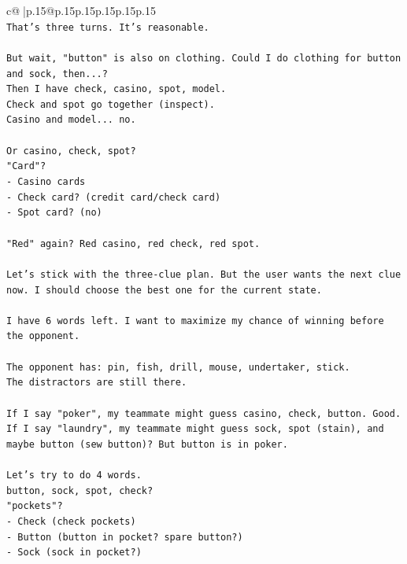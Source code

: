 \documentclass{article}
\begin{document}
{\begin{supertabular}{c@{$\;$}|p{.15\linewidth}@{}p{.15\linewidth}p{.15\linewidth}p{.15\linewidth}p{.15\linewidth}p{.15\linewidth}}
{{{\\ 
\texttt{That's three turns. It's reasonable.} \\
\\ 
\texttt{But wait, "button" is also on clothing. Could I do clothing for button and sock, then...?} \\
\texttt{Then I have check, casino, spot, model.} \\
\texttt{Check and spot go together (inspect).} \\
\texttt{Casino and model... no.} \\
\\ 
\texttt{Or casino, check, spot?} \\
\texttt{"Card"?} \\
\texttt{{-} Casino cards} \\
\texttt{{-} Check card? (credit card/check card)} \\
\texttt{{-} Spot card? (no)} \\
\\ 
\texttt{"Red" again? Red casino, red check, red spot.} \\
\\ 
\texttt{Let's stick with the three{-}clue plan. But the user wants the next clue now. I should choose the best one for the current state.} \\
\\ 
\texttt{I have 6 words left. I want to maximize my chance of winning before the opponent.} \\
\\ 
\texttt{The opponent has: pin, fish, drill, mouse, undertaker, stick.} \\
\texttt{The distractors are still there.} \\
\\ 
\texttt{If I say "poker", my teammate might guess casino, check, button. Good.} \\
\texttt{If I say "laundry", my teammate might guess sock, spot (stain), and maybe button (sew button)? But button is in poker.} \\
\\ 
\texttt{Let's try to do 4 words.} \\
\texttt{button, sock, spot, check?} \\
\texttt{"pockets"?} \\
\texttt{{-} Check (check pockets)} \\
\texttt{{-} Button (button in pocket? spare button?)} \\
\texttt{{-} Sock (sock in pocket?)} \\
}}}
\end{supertabular}}
\end{document}

